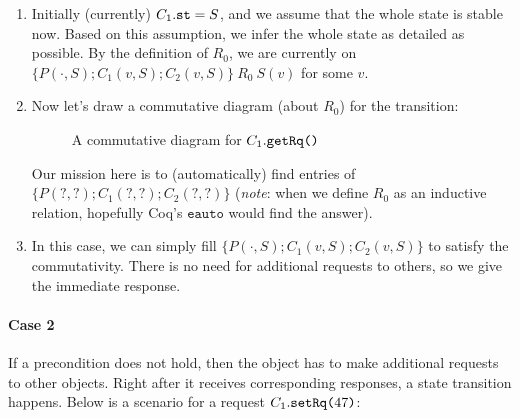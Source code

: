 \documentclass[format=manuscript]{acmart}
\begin{document}
\begin{enumerate}
\item Initially (currently) $C_1.\texttt{st} = S$, and we assume that the whole state
  is stable now. Based on this assumption, we infer the whole state as detailed
  as possible. By the definition of $R_0$, we are currently on $\{ P(\cdot, S);
  C_1(v, S); C_2(v, S) \}\ R_0\ S(v)$ for some $v$.
\item Now let's draw a commutative diagram (about $R_0$) for the transition:
  \begin{figure}[h]
    \caption{A commutative diagram for $C_1.\texttt{getRq()}$}
    \label{fig:comm-diagram-getrq}
  \end{figure}
  
  Our mission here is to (automatically) find entries of $\{ P(?, ?); C_1(?, ?);
  C_2(?, ?) \}$ (\emph{note}: when we define $R_0$ as an inductive relation,
  hopefully Coq's $\texttt{eauto}$ would find the answer).
\item In this case, we can simply fill $\{ P(\cdot, S); C_1(v, S); C_2(v, S) \}$
  to satisfy the commutativity. There is no need for additional requests to
  others, so we give the immediate response.
\end{enumerate}

\paragraph{Case 2}
If a precondition does not hold, then the object has to make additional requests
to other objects. Right after it receives corresponding responses, a state
transition happens. Below is a scenario for a request $C_1.\texttt{setRq(}47\texttt{)}$:
\end{document}
